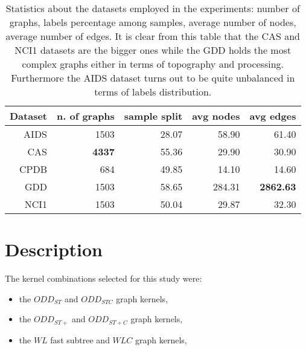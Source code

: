     \begin{table}[h]
        \centering
        \begin{tabular}{|r|r|r|r|r|}
            \hline
            Dataset & n. of graphs & sample split & avg nodes & avg edges \\ \hline
            AIDS    & 1503         & 28.07        & 58.90     & 61.40     \\ \hline      
            CAS     & \textbf{4337} & 55.36        & 29.90     & 30.90     \\ \hline      
            CPDB    &  684         & 49.85        & 14.10     & 14.60     \\ \hline      
            GDD     & 1503         & 58.65        & 284.31    & \textbf{2862.63}   \\ \hline      
            NCI1    & 1503         & 50.04        & 29.87     & 32.30     \\ \hline      
        \end{tabular}
        \label{table:datasets}
        \caption{Statistics about the datasets employed in the experiments: number
        of graphs, labels percentage among samples, average number of nodes, average
        number of edges. It is clear from this table that the CAS and NCI1 datasets
        are the bigger ones while the GDD holds the most complex graphs either in
        terms of topography and processing. Furthermore the AIDS dataset turns out
        to be quite unbalanced in terms of labels distribution.}
    \end{table}


\section{Description}

The kernel combinations selected for this study were:
\begin{itemize}
    \item the $ODD_{ST}$ and $ODD_{STC}$ graph kernels,
    \item the $ODD_{ST+}$ and $ODD_{ST+C}$ graph kernels,
    \item the $WL$ fast subtree and $WLC$ graph kernels,
\end{itemize}

